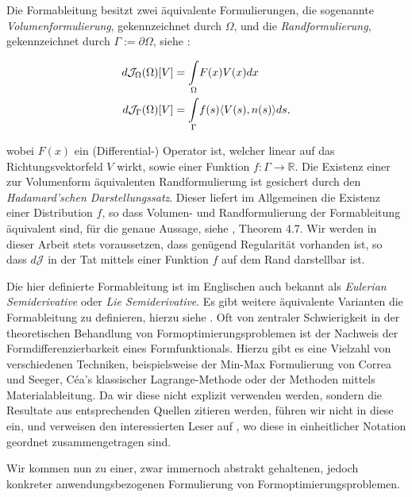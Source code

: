 Die Formableitung besitzt zwei äquivalente Formulierungen, die sogenannte \textit{Volumenformulierung}, gekennzeichnet durch $\Omega$, und die \textit{Randformulierung}, gekennzeichnet durch $\Gamma := \partial \Omega$, siehe \cite{bfgs2}:

\begin{align*}
	d\mathcal{J}_\Omega(\Omega)[V] &= \underset{\Omega}{\int}F(x)V(x)dx\\
	\vspace{0.5cm}
	d\mathcal{J}_\Gamma(\Omega)[V] &= \underset{\Gamma}{\int}f(s)\langle V(s),n(s)\rangle ds,
\end{align*}

wobei $F(x)$ ein (Differential-) Operator ist, welcher linear auf das Richtungsvektorfeld $V$ wirkt, sowie einer Funktion $f: \Gamma \rightarrow \mathbb{R}$. Die Existenz einer zur Volumenform äquivalenten Randformulierung ist gesichert durch den \textit{Hadamard'schen Darstellungssatz}. Dieser liefert im Allgemeinen die Existenz einer Distribution $f$, so dass Volumen- und Randformulierung der  Formableitung äquivalent sind, für die genaue Aussage, siehe \cite{shape_space}, Theorem 4.7. Wir werden in dieser Arbeit stets voraussetzen, dass genügend Regularität vorhanden ist, so dass $d\mathcal{J}$ in der Tat mittels einer Funktion $f$ auf dem Rand darstellbar ist.

Die hier definierte Formableitung ist im Englischen auch bekannt als \textit{Eulerian Semiderivative} oder \textit{Lie Semiderivative}. Es gibt weitere äquivalente Varianten die Formableitung zu definieren, hierzu siehe \cite{Shape_diff}. Oft von zentraler Schwierigkeit in der theoretischen Behandlung von Formoptimierungsproblemen ist der Nachweis der Formdifferenzierbarkeit eines Formfunktionals. Hierzu gibt es eine Vielzahl von verschiedenen Techniken, beispielsweise der Min-Max Formulierung von Correa und Seeger, Céa's klassischer Lagrange-Methode oder der Methoden mittels Materialableitung. Da wir diese nicht explizit verwenden werden, sondern die Resultate aus entsprechenden Quellen zitieren werden, führen wir nicht in diese ein, und verweisen den interessierten Leser auf \cite{Shape_diff}, wo diese in einheitlicher Notation geordnet zusammengetragen sind.

Wir kommen nun zu einer, zwar immernoch abstrakt gehaltenen, jedoch konkreter anwendungsbezogenen Formulierung von Formoptimierungsproblemen.

